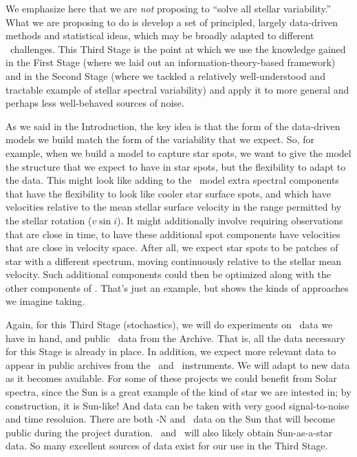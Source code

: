\documentclass[12pt, letterpaper]{article}
\begin{document}
We emphasize here that we are \textit{not} proposing to ``solve
all stellar variability.'' What we are proposing to do is develop a set of 
principled, largely data-driven methods and statistical ideas, which may be 
broadly adapted to different \EPRV\ challenges. This Third Stage is the 
point at which we use the knowledge gained in the First Stage (where we 
laid out an information-theory-based framework) and in the Second Stage 
(where we tackled a relatively well-understood and tractable example 
of stellar spectral variability) and apply it to more general and perhaps
less well-behaved sources of noise.

As we said in the Introduction, the key idea is that the form of the
data-driven models we build match the form of the variability that
we expect.
So, for example, when we build a model to capture star spots, we want
to give the model the structure that we expect to have in star spots,
but the flexibility to adapt to the data.
This might look like adding to the \wobble\ model extra spectral
components that have the flexibility to look like cooler star surface
spots, and which have velocities relative to the mean stellar surface
velocity in the range permitted by the stellar rotation ($v\sin i$).
It might additionally involve requiring observations that are close
in time, to have these additional spot components have velocities that
are close in velocity space.
After all, we expect star spots to be patches of star with a different
spectrum, moving continuously relative to the stellar mean velocity.
Such additional components could then be optimized along with the other
components of \wobble.
That's just an example, but shows the kinds of approaches we imagine taking.

Again, for this Third Stage (stochastics), we will do experiments on
\EXPRES\ data we have in hand, and
public \HARPS\ data from the Archive.
That is, all the data necessary for this Stage is already in place.
In addition, we expect more relevant data to appear in public archives
from the \ESPRESSO\ and \NEID\ instruments.
We will adapt to new data as it becomes available.
For some of these projects we could benefit from Solar
spectra, since the Sun is a great example of the kind of star we are
intested in; by construction, it is Sun-like!
And data can be taken with very good signal-to-noise and time resoluion.
There are both \HARPS-N and \HARPS\ data on the Sun that will become
public during the project duration. 
\EXPRES\ and \NEID\ will also likely obtain Sun-as-a-star data. 
So many excellent sources of data exist for our use in the Third Stage.
\end{document}
